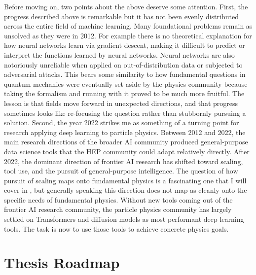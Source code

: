 Before moving on, two points about the above deserve some attention.
First, the progress described above is remarkable but it has not been evenly distributed across the entire field of machine learning.
Many foundational problems remain as unsolved as they were in 2012.
For example there is no theoretical explanation for how neural networks learn via gradient descent, making it difficult to predict or interpret the functions learned by neural networks.
Neural networks are also notoriously unreliable when applied on out-of-distribution data or subjected to adversarial attacks.
This bears some similarity to how fundamental questions in quantum mechanics were eventually set aside by the physics community because taking the formalism and running with it proved to be much more fruitful.
The lesson is that fields move forward in unexpected directions, and that progress sometimes looks like re-focusing the question rather than stubbornly pursuing a solution.
Second, the year 2022 strikes me as something of a turning point for research applying deep learning to particle physics.
Between 2012 and 2022, the main research directions of the broader AI community produced general-purpose data science tools that the HEP community could adapt relatively directly.
After 2022, the dominant direction of frontier AI research has shifted toward scaling, tool use, and the pursuit of general-purpose intelligence.
The question of how pursuit of scaling maps onto fundamental physics is a fascinating one that I will cover in , but generally speaking this direction does not map as cleanly onto the specific needs of fundamental physics.
Without new tools coming out of the frontier AI research community, the particle physics community has largely settled on Transformers and diffusion models as most performant deep learning tools.
The task is now to use those tools to achieve concrete physics goals.

%

\section{Thesis Roadmap}
\label{sec:roadmap}

